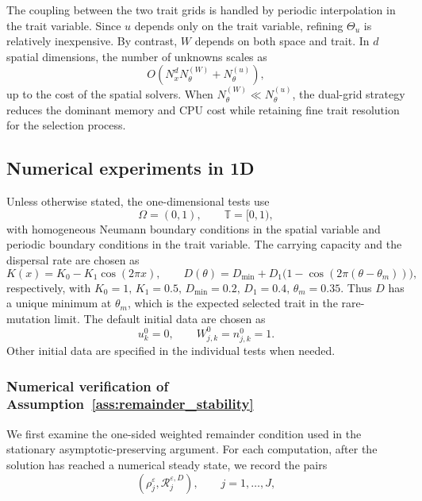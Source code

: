 \documentclass[11pt]{article}
\begin{document}
The coupling between the two trait grids is handled by periodic interpolation
in the trait variable.  Since \(u\) depends only on the trait variable,
refining \(\Theta_u\) is relatively inexpensive.  By contrast, \(W\) depends on
both space and trait.  In \(d\) spatial dimensions, the number of unknowns
scales as
\[
    O\!\left(N_x^d N_\theta^{(W)}+N_\theta^{(u)}\right),
\]
up to the cost of the spatial solvers.  When $N_\theta^{(W)} \ll N_\theta^{(u)}$, the dual-grid strategy reduces the
dominant memory and CPU cost while retaining fine trait resolution for the
selection process.


\subsection{Numerical experiments in 1D}
\label{subsec:numeric_1D}
Unless otherwise stated, the one-dimensional tests use
\[
    \Omega=(0,1),
    \qquad
    \mathbb T=[0,1),
\]
with homogeneous Neumann boundary conditions in the spatial variable and
periodic boundary conditions in the trait variable.  
The carrying capacity and the dispersal rate are chosen as 
\begin{equation}\label{eq:num_K_and_D}
    K(x)=K_0-K_1\cos(2\pi x),
    \qquad
    D(\theta) = D_{\min} + D_1\bigl(1-\cos(2\pi(\theta-\theta_m))\bigr),
\end{equation}
respectively, with $  K_0=1, \, K_1=0.5, \, D_{\min}=0.2,   \, D_1=0.4, \,   \theta_m=0.35$. 
Thus \(D\) has a unique minimum at \(\theta_m\), which is the expected selected
trait in the rare-mutation limit. 
The default initial data are chosen as 
\begin{equation}\label{eq:num_initial_W_new}
    u_k^0=0,
    \qquad
    W_{j,k}^0=n_{j,k}^0=1 .
\end{equation}
Other initial data are specified in the individual tests when needed.



\subsubsection{Numerical verification of Assumption~\ref{ass:remainder_stability}}
\label{subsec:test_assumptions_new}

We first examine the one-sided weighted remainder condition used in the
stationary asymptotic-preserving argument.  
For each computation, after the solution has reached a numerical steady state,
we record the pairs
\[
    \left(\rho_j^\varepsilon,\mathcal R_j^{\varepsilon,D}\right),
    \qquad j=1,\ldots,J,
\]
\end{document}
